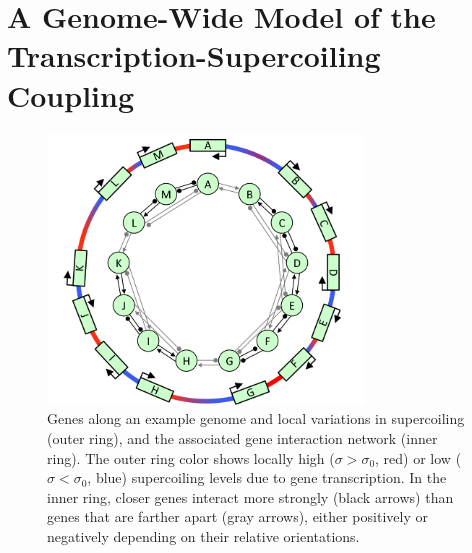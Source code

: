 
\section{A Genome-Wide Model of the Transcription-Supercoiling Coupling}
\label{sec:alife:indiv_model}

\begin{figure}[H]
\centering
\includegraphics[width=0.75\textwidth]{alife/img/reseau.png}
\caption[Hand-drawn genome and local interactions resulting from the TSC]{Genes along an example genome and local variations in supercoiling (outer ring), and the associated gene interaction network (inner ring).
The outer ring color shows locally high ($\sigma > \sigma_0$, red) or low ($\sigma < \sigma_0$, blue) supercoiling levels due to gene transcription.
In the inner ring, closer genes interact more strongly (black arrows) than genes that are farther apart (gray arrows), either positively or negatively depending on their relative orientations.}
\label{fig:alife:network}
\end{figure}


